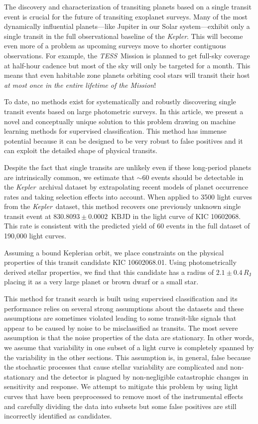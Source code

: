 \documentclass[12pt,preprint]{aastex}
\newcommand{\project}[1]{\textsl{#1}}
\newcommand{\kepler}{\project{Kepler}}
\newcommand{\tess}{\project{TESS}}
\newcommand{\paper}{article}
\begin{document}
The discovery and characterization of transiting planets based on a single
transit event is crucial for the future of transiting exoplanet surveys.
Many of the most dynamically influential planets---like Jupiter in our Solar
system---exhibit only a single transit in the full observational baseline of
the \kepler.
This will become even more of a problem as upcoming surveys move to shorter
contiguous observations.
For example, the \tess\ Mission is planned to get full-sky coverage at
half-hour cadence but most of the sky will only be targeted for a month.
This means that even habitable zone planets orbiting cool stars will transit
their host \emph{at most once in the entire lifetime of the Mission}!

To date, no methods exist for systematically and robustly discovering single
transit events based on large photometric surveys.
In this \paper, we present a novel and conceptually unique solution to this
problem drawing on machine learning methods for supervised classification.
This method has immense potential because it can be designed to be very robust
to false positives and it can exploit the detailed shape of physical transits.

Despite the fact that single transits are unlikely even if these long-period
planets are intrinsically common, we estimate that $\sim 60$ events should be
detectable in the \kepler\ archival dataset by extrapolating recent models of
planet occurrence rates and taking selection effects into account.
When applied to 3500 light curves from the \kepler\ dataset, this method
recovers one previously unknown single transit event at
$830.8093\pm0.0002$~KBJD in the light curve of KIC 10602068.
This rate is consistent with the predicted yield of 60 events in the full
dataset of 190,000 light curves.

Assuming a bound Keplerian orbit, we place constraints on the physical
properties of this transit candidate KIC 10602068.01.
Using photometrically derived stellar properties, we find that this candidate
has a radius of $2.1 \pm 0.4\,R_\mathrm{J}$ placing it as a very large planet
or brown dwarf or a small star.

This method for transit search is built using supervised classification and
its performance relies on several strong assumptions about the datasets and
these assumptions are sometimes violated leading to some transit-like signals
that appear to be caused by noise to be misclassified as transits.
The most severe assumption is that the noise properties of the data are
stationary.
In other words, we assume that variability in one subset of a light curve is
completely spanned by the variability in the other sections.
This assumption is, in general, false because the stochastic processes that
cause stellar variability are complicated and non-stationary and the detector
is plagued by non-negligible catastrophic changes in sensitivity and response.
We attempt to mitigate this problem by using light curves that have been
preprocessed to remove most of the instrumental effects and carefully dividing
the data into subsets but some false positives are still incorrectly
identified as candidates.
\end{document}
